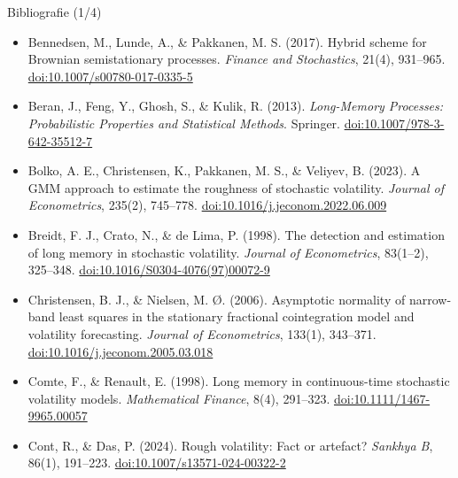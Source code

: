 \begin{frame}{Bibliografie (1/4)}
\begin{itemize}
    \item Bennedsen, M., Lunde, A., \& Pakkanen, M. S. (2017). Hybrid scheme for Brownian semistationary processes. \textit{Finance and Stochastics}, 21(4), 931--965. \href{https://doi.org/10.1007/s00780-017-0335-5}{doi:10.1007/s00780-017-0335-5}
    \item Beran, J., Feng, Y., Ghosh, S., \& Kulik, R. (2013). \textit{Long-Memory Processes: Probabilistic Properties and Statistical Methods}. Springer. \href{https://doi.org/10.1007/978-3-642-35512-7}{doi:10.1007/978-3-642-35512-7}
    \item Bolko, A. E., Christensen, K., Pakkanen, M. S., \& Veliyev, B. (2023). A GMM approach to estimate the roughness of stochastic volatility. \textit{Journal of Econometrics}, 235(2), 745--778. \href{https://doi.org/10.1016/j.jeconom.2022.06.009}{doi:10.1016/j.jeconom.2022.06.009}
    \item Breidt, F. J., Crato, N., \& de Lima, P. (1998). The detection and estimation of long memory in stochastic volatility. \textit{Journal of Econometrics}, 83(1--2), 325--348. \href{https://doi.org/10.1016/S0304-4076(97)00072-9}{doi:10.1016/S0304-4076(97)00072-9}
    \item Christensen, B. J., \& Nielsen, M. Ø. (2006). Asymptotic normality of narrow-band least squares in the stationary fractional cointegration model and volatility forecasting. \textit{Journal of Econometrics}, 133(1), 343--371. \href{https://doi.org/10.1016/j.jeconom.2005.03.018}{doi:10.1016/j.jeconom.2005.03.018}
    \item Comte, F., \& Renault, E. (1998). Long memory in continuous-time stochastic volatility models. \textit{Mathematical Finance}, 8(4), 291--323. \href{https://doi.org/10.1111/1467-9965.00057}{doi:10.1111/1467-9965.00057}
    \item Cont, R., \& Das, P. (2024). Rough volatility: Fact or artefact? \textit{Sankhya B}, 86(1), 191--223. \href{https://doi.org/10.1007/s13571-024-00322-2}{doi:10.1007/s13571-024-00322-2}
\end{itemize}
\end{frame}

